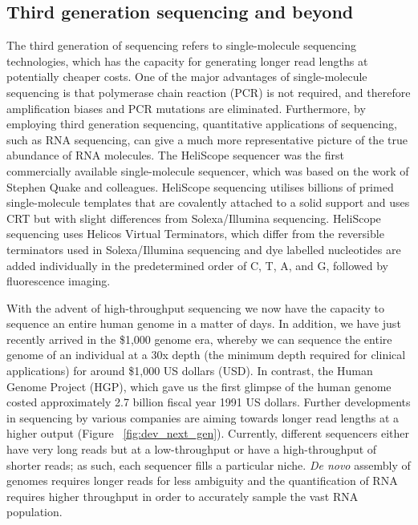 \subsection{Third generation sequencing and beyond}

The third generation of sequencing refers to single-molecule sequencing technologies, which has the capacity for generating longer read lengths at potentially cheaper costs\cite{pmid20858600}. One of the major advantages of single-molecule sequencing is that polymerase chain reaction (PCR) is not required, and therefore amplification biases and PCR mutations are eliminated. Furthermore, by employing third generation sequencing, quantitative applications of sequencing, such as RNA sequencing, can give a much more representative picture of the true abundance of RNA molecules. The HeliScope sequencer was the first commercially available single-molecule sequencer, which was based on the work of Stephen Quake and colleagues\cite{pmid12651960}. HeliScope sequencing utilises billions of primed single-molecule templates that are covalently attached to a solid support and uses CRT but with slight differences from Solexa/Illumina sequencing. HeliScope sequencing uses Helicos Virtual Terminators, which differ from the reversible terminators used in Solexa/Illumina sequencing and dye labelled nucleotides are added individually in the predetermined order of C, T, A, and G, followed by fluorescence imaging.

With the advent of high-throughput sequencing we now have the capacity to sequence an entire human genome in a matter of days. In addition, we have just recently arrived in the \$1,000 genome era, whereby we can sequence the entire genome of an individual at a 30x depth (the minimum depth required for clinical applications) for around \$1,000 US dollars (USD). In contrast, the Human Genome Project (HGP), which gave us the first glimpse of the human genome\cite{lander2001initial} costed approximately 2.7 billion fiscal year 1991 US dollars\cite{nhgri2010cost}. Further developments in sequencing by various companies are aiming towards longer read lengths at a higher output (Figure ~\ref{fig:dev_next_gen}). Currently, different sequencers either have very long reads but at a low-throughput or have a high-throughput of shorter reads; as such, each sequencer fills a particular niche. \textit{De novo} assembly of genomes requires longer reads for less ambiguity and the quantification of RNA requires higher throughput in order to accurately sample the vast RNA population.


